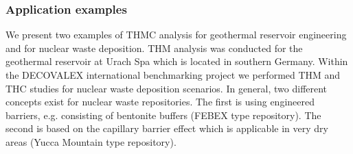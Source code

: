 \subsubsection*{Application examples}
We present two examples of THMC analysis for geothermal reservoir engineering and for nuclear waste deposition. THM analysis was conducted for the geothermal reservoir at Urach Spa which is located in southern Germany. Within the DECOVALEX international benchmarking project we performed THM and THC studies for nuclear waste deposition scenarios. In general, two different concepts exist for nuclear waste repositories. The first is using engineered barriers, e.g. consisting of bentonite buffers (FEBEX type repository). The second is based on the capillary barrier effect which is applicable in very dry areas (Yucca Mountain type repository).
